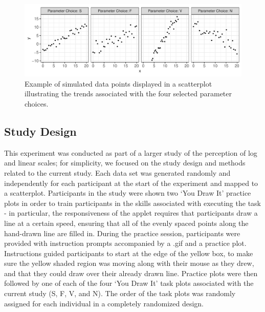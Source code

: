 \documentclass[12pt]{article}
\begin{document}
\begin{figure}[tbp]

{\centering \includegraphics[width=1\linewidth,]{Eye-Fitting-Straight-Lines-in-the-Modern-Era_files/figure-latex/eyefitting-simplot-1} 

}

\caption{Example of simulated data points displayed in a scatterplot illustrating the trends associated with the four selected parameter choices.}\label{fig:eyefitting-simplot}
\end{figure}

\hypertarget{study-design}{%
\subsection{Study Design}\label{study-design}}

This experiment was conducted as part of a larger study of the
perception of log and linear scales; for simplicity, we focused on the
study design and methods related to the current study. Each data set was
generated randomly and independently for each participant at the start
of the experiment and mapped to a scatterplot. Participants in the study
were shown two `You Draw It' practice plots in order to train
participants in the skills associated with executing the task - in
particular, the responsiveness of the applet requires that participants
draw a line at a certain speed, ensuring that all of the evenly spaced
points along the hand-drawn line are filled in. During the practice
session, participants were provided with instruction prompts accompanied
by a .gif and a practice plot. Instructions guided participants to start
at the edge of the yellow box, to make sure the yellow shaded region was
moving along with their mouse as they drew, and that they could draw
over their already drawn line. Practice plots were then followed by one
of each of the four `You Draw It' task plots associated with the current
study (S, F, V, and N). The order of the task plots was randomly
assigned for each individual in a completely randomized design.
\end{document}
